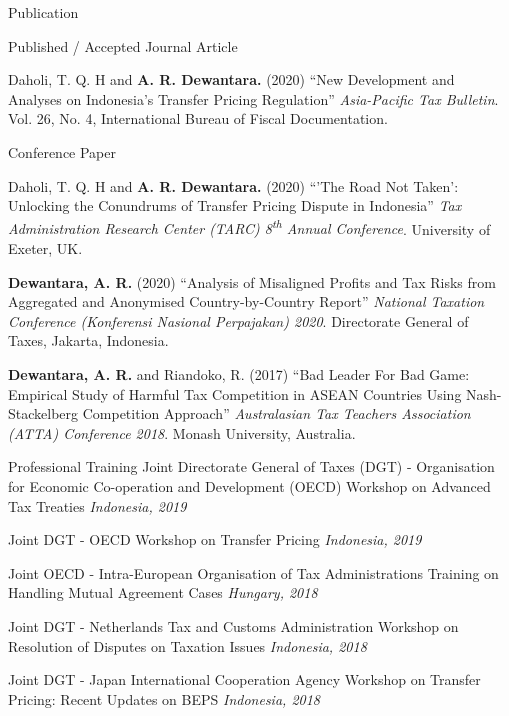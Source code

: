 \documentclass{resume}
\begin{document}
\begin{rSection}{Publication}
\begin{rSubsection}{Published / Accepted Journal Article}{}{}{}
 \item Daholi, T. Q. H and \textbf{A. R. Dewantara.} (2020) “New Development and Analyses on Indonesia’s Transfer Pricing Regulation” \textit{Asia-Pacific Tax Bulletin}. Vol. 26, No. 4, International Bureau of Fiscal Documentation.
\end{rSubsection}
\begin{rSubsection}{Conference Paper}{}{}{}
\item Daholi, T. Q. H and \textbf{A. R. Dewantara.} (2020) “’The Road Not Taken’: Unlocking the Conundrums of Transfer Pricing Dispute in Indonesia” \textit{Tax Administration Research Center (TARC) 8\textsuperscript{th} Annual Conference}. University of Exeter, UK.
\item \textbf{Dewantara, A. R.} (2020) “Analysis of Misaligned Profits and Tax Risks from Aggregated and Anonymised Country-by-Country Report” \textit{National Taxation Conference (Konferensi Nasional Perpajakan) 2020}. Directorate General of Taxes, Jakarta, Indonesia.
\item \textbf{Dewantara, A. R.} and Riandoko, R. (2017) “Bad Leader For Bad Game: Empirical Study of Harmful Tax Competition in ASEAN Countries Using Nash-Stackelberg Competition Approach” \textit{Australasian Tax Teachers Association (ATTA) Conference 2018}. Monash University, Australia.
\end{rSubsection}
\end{rSection}
\newpage
\begin{rSection}{Professional Training}
{Joint Directorate General of Taxes (DGT) - Organisation for Economic Co-operation and Development (OECD) Workshop on Advanced Tax Treaties} \hfill {\em Indonesia, 2019} 

{Joint DGT - OECD Workshop on Transfer Pricing} \hfill {\em Indonesia, 2019} 

{Joint OECD - Intra-European Organisation of Tax Administrations Training on Handling Mutual Agreement Cases} \hfill {\em Hungary, 2018}

{Joint DGT - Netherlands Tax and Customs Administration Workshop on Resolution of Disputes on Taxation Issues} \hfill {\em Indonesia, 2018}

{Joint DGT - Japan International Cooperation Agency Workshop on Transfer Pricing: Recent Updates on BEPS} \hfill {\em Indonesia, 2018}
\end{rSection}
\end{document}
